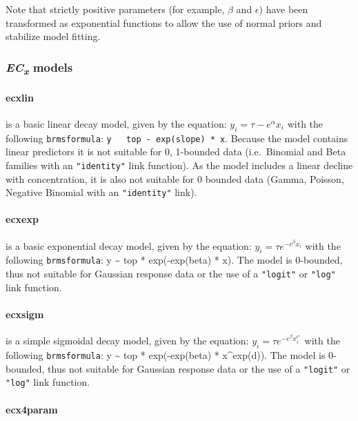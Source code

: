 \documentclass[
  shortnames]{jss}
\begin{document}
Note that strictly positive parameters (for example, \(\beta\) and \(\epsilon\)) have been transformed as exponential functions to allow the use of normal priors and stabilize model fitting.

\subsubsection[ECx models]{\textit{EC\textsubscript{x}} models}\label{ecx-models}

\hypertarget{ecxlin}{%
\paragraph{ecxlin}\label{ecxlin}}

is a basic linear decay model, given by the equation:
\(y_i = \tau - e^{\alpha} x_i\)
with the following \texttt{brmsformula}: \texttt{y ~ top - exp(slope) * x}. Because the model contains linear predictors it is not suitable for 0, 1-bounded data (i.e.~Binomial and Beta families with an \texttt{"identity"} link function). As the model includes a linear decline with concentration, it is also not suitable for 0 bounded data (Gamma, Poisson, Negative Binomial with an \texttt{"identity"} link).

\hypertarget{ecxexp}{%
\paragraph{ecxexp}\label{ecxexp}}

is a basic exponential decay model, given by the equation: \(y_i = \tau e^{-e^{\beta} x_i}\)
with the following \texttt{brmsformula}: y \textasciitilde{} top * exp(-exp(beta) * x). The model is 0-bounded, thus not suitable for Gaussian response data or the use of a \texttt{"logit"} or \texttt{"log"} link function.

\hypertarget{ecxsigm}{%
\paragraph{ecxsigm}\label{ecxsigm}}

is a simple sigmoidal decay model, given by the equation:
\(y_i = \tau e^{-e^{\beta} x_i^{e^\epsilon}}\)
with the following \texttt{brmsformula}: y \textasciitilde{} top * exp(-exp(beta) * x\^{}exp(d)). The model is 0-bounded, thus not suitable for Gaussian response data or the use of a \texttt{"logit"} or \texttt{"log"} link function.

\hypertarget{ecx4param}{%
\paragraph{ecx4param}\label{ecx4param}}
\end{document}
